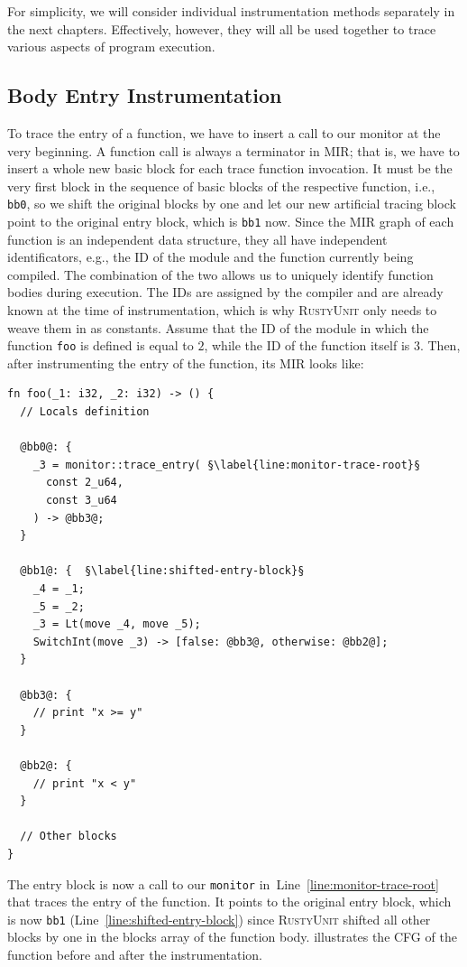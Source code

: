 \documentclass[paper=a4,%
  twoside,%
  BCOR4mm,%
  abstract=true,%
  toc=bibliography,%
  chapterprefix=true,%
  toc=bibliographynumbered,%
  open=right,%
  english,%
  pagesize=pdftex]{scrreprt}
\newcommand{\tech}{\textsc{RustyUnit}\xspace}
\newcommand{\mir}{\ac{MIR}\xspace}
\newcommand{\cfg}{\ac{CFG}\xspace}
\begin{document}
For simplicity, we will consider individual instrumentation methods separately in the next chapters. Effectively, however, they will all be used together to trace various aspects of program execution.

\subsection{Body Entry Instrumentation}
To trace the entry of a function, we have to insert a call to our monitor at the very beginning. A function call is always a terminator in \mir; that is, we have to insert a whole new basic block for each trace function invocation. It must be the very first block in the sequence of basic blocks of the respective function, i.e., \texttt{bb0}, so we shift the original blocks by one and let our new artificial tracing block point to the original entry block, which is \texttt{bb1} now. Since the \mir graph of each function is an independent data structure, they all have independent identificators, e.g., the ID of the module and the function currently being compiled. The combination of the two allows us to uniquely identify function bodies during execution. The IDs are assigned by the compiler and are already known at the time of instrumentation, which is why \tech only needs to weave them in as constants. Assume that the ID of the module in which the function \texttt{foo} is defined is equal to $2$, while the ID of the function itself is $3$. Then, after instrumenting the entry of the function, its \mir looks like:

\begin{lstlisting}[language={MIR}, style=boxed, caption={}, escapechar=§, label=lst:mir-instrument-root]
fn foo(_1: i32, _2: i32) -> () {
  // Locals definition

  @bb0@: {
    _3 = monitor::trace_entry( §\label{line:monitor-trace-root}§
      const 2_u64,
      const 3_u64
    ) -> @bb3@;
  }

  @bb1@: {  §\label{line:shifted-entry-block}§
    _4 = _1;
    _5 = _2;
    _3 = Lt(move _4, move _5);
    SwitchInt(move _3) -> [false: @bb3@, otherwise: @bb2@];
  }

  @bb3@: {
    // print "x >= y"
  }

  @bb2@: {
    // print "x < y"
  }

  // Other blocks
}
\end{lstlisting}

The entry block is now a call to our \texttt{monitor} in~Line~\ref{line:monitor-trace-root} that traces the entry of the function. It points to the original entry block, which is now \texttt{bb1} (Line~\ref{line:shifted-entry-block}) since \tech shifted all other blocks by one in the blocks array of the function body.  illustrates the \cfg of the function before and after the instrumentation.
\end{document}
